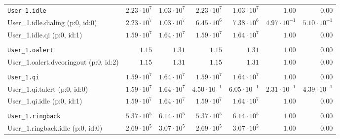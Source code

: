 \begin{table}[htbp]
{\begin{tabular}{lrrrrrr}
\\[-8pt]\texttt{User\_1.idle}                         &  $2.23 \cdot 10^{7}$ &  $1.03 \cdot 10^{7}$ &  $2.23 \cdot 10^{7}$ &  $1.03 \cdot 10^{7}$ &               $1.00$ &               $0.00$ \\
\hspace{3mm}User\_1.idle.dialing (p:0, id:0)          &  $2.23 \cdot 10^{7}$ &  $1.03 \cdot 10^{7}$ &  $6.45 \cdot 10^{6}$ &  $7.38 \cdot 10^{6}$ & $4.97 \cdot 10^{-1}$ & $5.10 \cdot 10^{-1}$ \\
\hspace{3mm}User\_1.idle.qi (p:0, id:1)               &  $1.59 \cdot 10^{7}$ &  $1.64 \cdot 10^{7}$ &  $1.59 \cdot 10^{7}$ &  $1.64 \cdot 10^{7}$ &               $1.00$ &               $0.00$ \\
\\[-8pt]\texttt{User\_1.oalert}                       &               $1.15$ &               $1.31$ &               $1.15$ &               $1.31$ &               $1.00$ &               $0.00$ \\
\hspace{3mm}User\_1.oalert.dveoringout (p:0, id:2)    &               $1.15$ &               $1.31$ &               $1.15$ &               $1.31$ &               $1.00$ &               $0.00$ \\
\\[-8pt]\texttt{User\_1.qi}                           &  $1.59 \cdot 10^{7}$ &  $1.64 \cdot 10^{7}$ &  $1.59 \cdot 10^{7}$ &  $1.64 \cdot 10^{7}$ &               $1.00$ &               $0.00$ \\
\hspace{3mm}User\_1.qi.talert (p:0, id:0)             &  $1.59 \cdot 10^{7}$ &  $1.64 \cdot 10^{7}$ & $4.50 \cdot 10^{-1}$ & $6.05 \cdot 10^{-1}$ & $2.31 \cdot 10^{-1}$ & $4.39 \cdot 10^{-1}$ \\
\hspace{3mm}User\_1.qi.idle (p:0, id:1)               &  $1.59 \cdot 10^{7}$ &  $1.64 \cdot 10^{7}$ &  $1.59 \cdot 10^{7}$ &  $1.64 \cdot 10^{7}$ &               $1.00$ &               $0.00$ \\
\\[-8pt]\texttt{User\_1.ringback}                     &  $5.37 \cdot 10^{5}$ &  $6.14 \cdot 10^{5}$ &  $5.37 \cdot 10^{5}$ &  $6.14 \cdot 10^{5}$ &               $1.00$ &               $0.00$ \\
\hspace{3mm}User\_1.ringback.idle (p:0, id:0)         &  $2.69 \cdot 10^{5}$ &  $3.07 \cdot 10^{5}$ &  $2.69 \cdot 10^{5}$ &  $3.07 \cdot 10^{5}$ &               $1.00$ &               $0.00$ \\

\end{tabular}}
\end{table}

